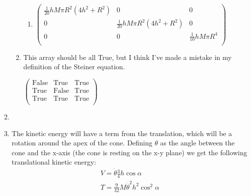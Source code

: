 \documentclass[10pt]{article}
\begin{document}
\begin{enumerate}
\begin{enumerate}
\begin{enumerate}
                \item\begin{doublespace}
                         \noindent\(\left(
                         \begin{array}{ccc}
                             \frac{1}{20} h M \pi  R^2 \left(4 h^2+R^2\right) & 0                                              & 0                       \\
                             0                                              & \frac{1}{20} h M \pi  R^2 \left(4 h^2+R^2\right) & 0                       \\
                             0                                              & 0                                              & \frac{1}{10} h M \pi  R^4 \\
                         \end{array}
                         \right)\)
                \end{doublespace}
            \end{enumerate}
            \item This array should be all True, but I think I've made a mistake in my definition of the Steiner equation.
            \begin{doublespace}
                \noindent\(\left(
                \begin{array}{ccc}
                    \text{False} & \text{True}  & \text{True} \\
                    \text{True}  & \text{False} & \text{True} \\
                    \text{True}  & \text{True}  & \text{True} \\
                \end{array}
                \right)\)
            \end{doublespace}
        \end{enumerate}
        \item
        \item The kinetic energy will have a term from the translation, which will be a rotation around the apex of the cone.
        Defining $\theta$ as the angle between the cone and the x-axis (the cone is resting on the x-y plane) we get the following translational kinetic energy:
        \begin{gather*}
            V=\dot{\theta}\frac{3}{4}h\cos\alpha\\
            T=\frac{9}{32}M\dot{\theta}^2 h^2\cos^2\alpha
        \end{gather*}

\end{enumerate}
\end{document}
